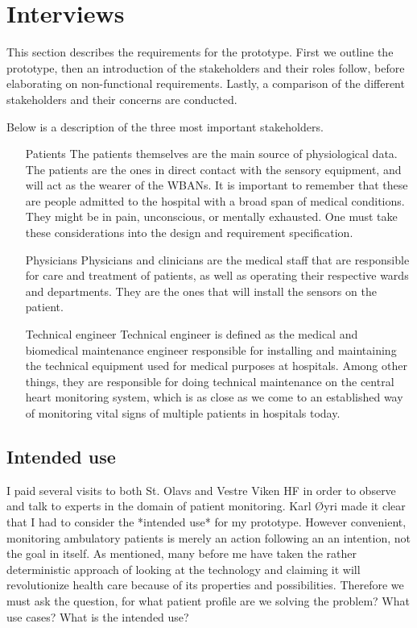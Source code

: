 \section{Interviews} %
\label{sec:interviews}

This section describes the requirements for the prototype. First we outline the prototype, then an introduction of the stakeholders and their roles follow, before elaborating on non-functional requirements. Lastly, a comparison of the different stakeholders and their concerns are conducted. 

Below is a description of the three most important stakeholders.

\begin{itemize}

  \item[Patients] The patients themselves are the main source of physiological data. The patients are the ones in direct contact with the sensory equipment, and will act as the wearer of the  WBANs. It is important to remember that these are people admitted to the hospital with a broad span of medical conditions. They might be in pain, unconscious, or mentally exhausted. One must take these considerations into the design and requirement specification.

  \item[Physicians] Physicians and clinicians are the medical staff that are responsible for care and treatment of patients, as well as operating their respective wards and departments. They are the ones that will install the sensors on the patient.

  \item[Technical engineer] Technical engineer is defined as the medical and biomedical maintenance engineer responsible for installing and maintaining the technical equipment used for medical purposes at hospitals. Among other things, they are responsible for doing technical maintenance  on the central heart monitoring system, which is as close as we come to an established way of monitoring vital signs of multiple patients in hospitals today.

\end{itemize}


\subsection{Intended use} %
\label{sub:intended_use}

I paid several visits to both St. Olavs and Vestre Viken HF in order to observe and talk to experts in the domain of patient monitoring. Karl Øyri made it clear that I had to consider the *intended use* for my prototype. However convenient, monitoring ambulatory patients is merely an action following an an intention, not the goal in itself. As mentioned, many before me have taken the rather deterministic approach of looking at the technology and claiming it will revolutionize health care because of its properties and possibilities. Therefore we must ask the question, for what patient profile are we solving the problem? What use cases? What is the intended use?

